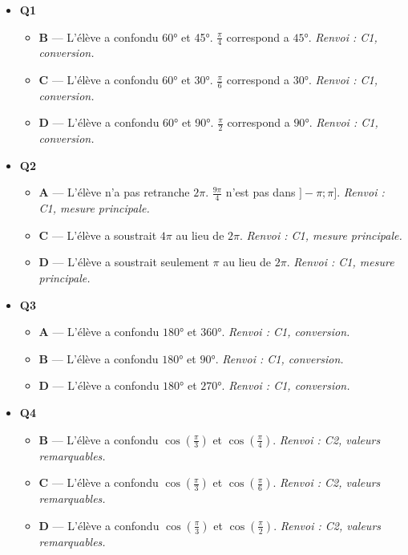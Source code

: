 \begin{itemize}
  \item \textbf{Q1}
  \begin{itemize}
    \item \textbf{B} — L'élève a confondu 60° et 45°. $\frac{\pi}{4}$ correspond a $45°$. \emph{Renvoi : C1, conversion.}
    \item \textbf{C} — L'élève a confondu 60° et 30°. $\frac{\pi}{6}$ correspond a $30°$. \emph{Renvoi : C1, conversion.}
    \item \textbf{D} — L'élève a confondu 60° et 90°. $\frac{\pi}{2}$ correspond a $90°$. \emph{Renvoi : C1, conversion.}
  \end{itemize}
  \item \textbf{Q2}
  \begin{itemize}
    \item \textbf{A} — L'élève n'a pas retranche $2\pi$. $\frac{9\pi}{4}$ n'est pas dans $]-\pi;\pi]$. \emph{Renvoi : C1, mesure principale.}
    \item \textbf{C} — L'élève a soustrait $4\pi$ au lieu de $2\pi$. \emph{Renvoi : C1, mesure principale.}
    \item \textbf{D} — L'élève a soustrait seulement $\pi$ au lieu de $2\pi$. \emph{Renvoi : C1, mesure principale.}
  \end{itemize}
  \item \textbf{Q3}
  \begin{itemize}
    \item \textbf{A} — L'élève a confondu $180°$ et $360°$. \emph{Renvoi : C1, conversion.}
    \item \textbf{B} — L'élève a confondu $180°$ et $90°$. \emph{Renvoi : C1, conversion.}
    \item \textbf{D} — L'élève a confondu $180°$ et $270°$. \emph{Renvoi : C1, conversion.}
  \end{itemize}
  \item \textbf{Q4}
  \begin{itemize}
    \item \textbf{B} — L'élève a confondu $\cos(\frac{\pi}{3})$ et $\cos(\frac{\pi}{4})$. \emph{Renvoi : C2, valeurs remarquables.}
    \item \textbf{C} — L'élève a confondu $\cos(\frac{\pi}{3})$ et $\cos(\frac{\pi}{6})$. \emph{Renvoi : C2, valeurs remarquables.}
    \item \textbf{D} — L'élève a confondu $\cos(\frac{\pi}{3})$ et $\cos(\frac{\pi}{2})$. \emph{Renvoi : C2, valeurs remarquables.}
  \end{itemize}

\end{itemize}
